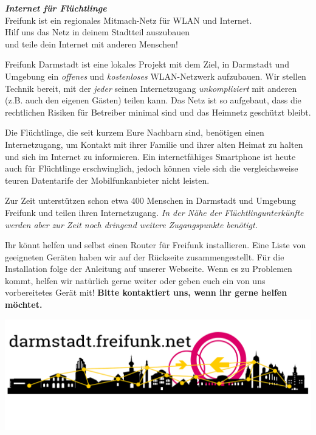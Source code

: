 \documentclass[a4paper]{article}
\begin{document}
\thispagestyle{empty}

\begin{center}
\Huge \textit{\textbf{\textcolor{freifunkpink}{Internet für Flüchtlinge}}} \\
\vspace{0.6cm}
\large Freifunk ist ein regionales Mitmach-Netz für WLAN und Internet.\\
Hilf uns das Netz in deinem Stadtteil auszubauen \\
und teile dein Internet mit anderen Menschen!
\normalsize

\vspace{1.0cm}
\end{center}

{ }
\vspace{0.5cm}

Freifunk Darmstadt ist eine lokales Projekt mit dem Ziel, in Darmstadt und Umgebung ein \emph{offenes} und \emph{kostenloses} WLAN-Netzwerk aufzubauen. Wir stellen Technik bereit, mit der \emph{jeder} seinen Internetzugang \emph{unkompliziert} mit anderen (z.B. auch den eigenen Gästen) teilen kann. Das Netz ist so aufgebaut, dass die rechtlichen Risiken für Betreiber minimal sind und das Heimnetz geschützt bleibt.

Die Flüchtlinge, die seit kurzem Eure Nachbarn sind, benötigen einen Internetzugang, um Kontakt mit ihrer Familie und ihrer alten Heimat zu halten und sich im Internet zu informieren. Ein internetfähiges Smartphone ist heute auch für Flüchtlinge erschwinglich, jedoch können viele sich die vergleichsweise teuren Datentarife der Mobilfunkanbieter nicht leisten.

Zur Zeit unterstützen schon etwa 400 Menschen in Darmstadt und Umgebung Freifunk und teilen ihren Internetzugang. \emph{In der Nähe der Flüchtlingunterkünfte werden aber zur Zeit noch dringend weitere Zugangspunkte benötigt.}

Ihr könnt helfen und selbst einen Router für Freifunk installieren. Eine Liste von geeigneten Geräten haben wir auf der Rückseite zusammengestellt. Für die Installation folge der Anleitung auf unserer Webseite. Wenn es zu Problemen kommt, helfen wir natürlich gerne weiter oder geben euch ein von uns vorbereitetes Gerät mit! \textbf{Bitte kontaktiert uns, wenn ihr gerne helfen möchtet.}

\vspace{0.6cm}

\begin{center}
\includegraphics[width=\textwidth]{../images/footer_dark}
\end{center}
\end{document}
